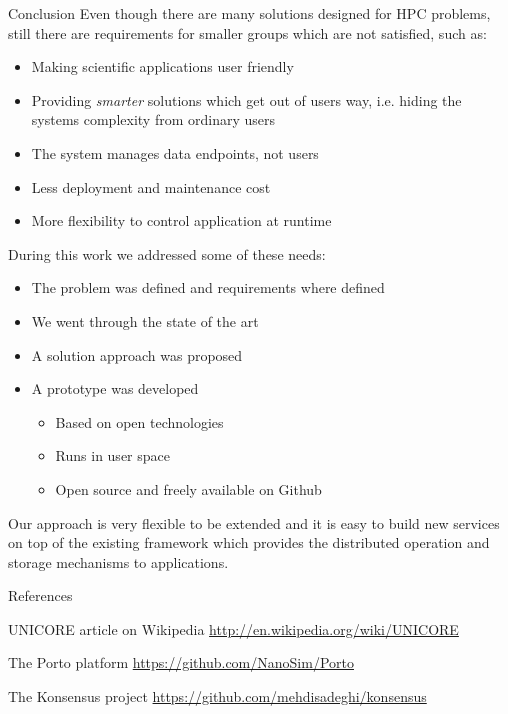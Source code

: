 \documentclass[final,hyperref={pdfpagelabels=true}]{beamer}
\begin{document}
\begin{frame}
\begin{columns}[t]
\begin{column}{.45\textwidth}
	  \begin{block}{Conclusion}
	  Even though there are many solutions designed for HPC problems, still there are requirements for smaller groups which are not satisfied, such as:
	  \begin{itemize}
	  \item Making scientific applications user friendly 
	  \item Providing \textit{smarter} solutions which get out of users way, i.e. hiding the systems complexity from ordinary users
	  \item The system manages data endpoints, not users
	  \item Less deployment and maintenance cost
	  \item More flexibility to control application at runtime
	  \end{itemize}
	  During this work we addressed some of these needs:
	  \begin{itemize}
	  \item The problem was defined and requirements where defined
	  \item We went through the state of the art
	  \item A solution approach was proposed
	  \item A prototype was developed
	  \begin{itemize}
	  \fontsize{30pt}{31}\selectfont
	  \item Based on open technologies
	  \item Runs in user space
	  \item Open source and freely available on Github
	  \end{itemize}
	  \end{itemize}
	  Our approach is very flexible to be extended and it is easy to build new services on top of the existing framework 
	  which provides the distributed operation and storage mechanisms to applications.
	  \end{block}
      \begin{block}{References}
      \fontsize{17pt}{18}\selectfont
        \begin{thebibliography}{999}
        UNICORE article on Wikipedia
        \url{http://en.wikipedia.org/wiki/UNICORE}
        
        The Porto platform
        \url{https://github.com/NanoSim/Porto}
        
        The Konsensus project \url{https://github.com/mehdisadeghi/konsensus}
%          
          

\end{thebibliography}
\end{block}
\end{column}
\end{columns}
\end{frame}
\end{document}
